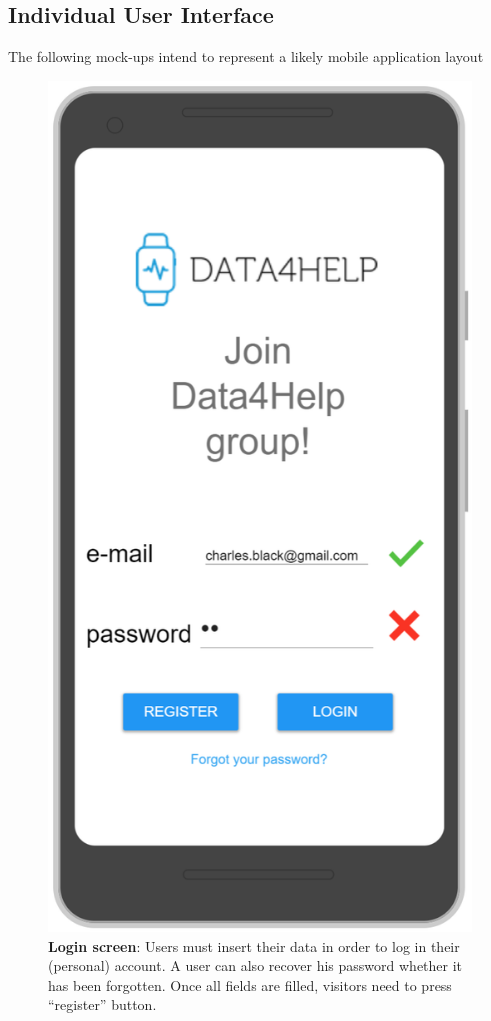 \subsection{Individual User Interface}
The following mock-ups intend to represent a likely mobile application layout 

\begin{figure}[H]
\centering
\includegraphics[scale = 0.5]{Mocks/Mobile_Login.PNG}
\caption{\textbf{Login screen}: Users must insert their data in order to log in their (personal) account. A user can also recover his password whether it has been forgotten. Once all fields are filled, visitors need to press “register” button.}
\end{figure}

